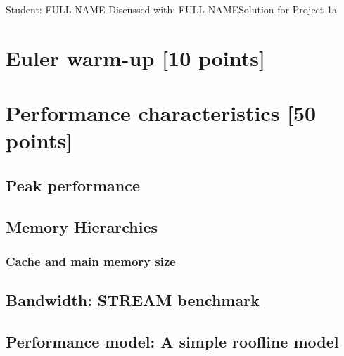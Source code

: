 \documentclass[unicode,11pt,a4paper,oneside,numbers=endperiod,openany]{scrartcl}
\begin{document}
\setassignment
{}

            {Student: FULL NAME}
            {Discussed with: FULL NAME}{Solution for Project 1a}{}
\newline

\assignmentpolicy

\section{Euler warm-up [10 points]}

\section{Performance characteristics [50 points]}

\subsection{Peak performance}

\subsection{Memory Hierarchies}

\subsubsection{Cache and main memory size}

\subsection{Bandwidth: STREAM benchmark}

\subsection{Performance model: A simple roofline model}
\end{document}
